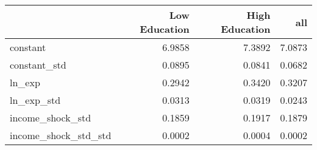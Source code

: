 \begin{tabular}{lrrr}
\toprule
 & Low Education & High Education & all \\
\midrule
constant & 6.9858 & 7.3892 & 7.0873 \\
constant_std & 0.0895 & 0.0841 & 0.0682 \\
ln_exp & 0.2942 & 0.3420 & 0.3207 \\
ln_exp_std & 0.0313 & 0.0319 & 0.0243 \\
income_shock_std & 0.1859 & 0.1917 & 0.1879 \\
income_shock_std_std & 0.0002 & 0.0004 & 0.0002 \\
\bottomrule
\end{tabular}
